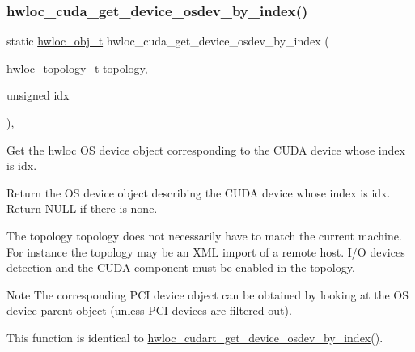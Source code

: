 \subsubsection{\texorpdfstring{hwloc\+\_\+cuda\+\_\+get\+\_\+device\+\_\+osdev\+\_\+by\+\_\+index()}{hwloc\_cuda\_get\_device\_osdev\_by\_index()}}
{\footnotesize\ttfamily static \hyperlink{a00185_ga79b8ab56877ef99ac59b833203391c7d}{hwloc\+\_\+obj\+\_\+t} hwloc\+\_\+cuda\+\_\+get\+\_\+device\+\_\+osdev\+\_\+by\+\_\+index (\begin{DoxyParamCaption}\item[{\hyperlink{a00186_ga9d1e76ee15a7dee158b786c30b6a6e38}{hwloc\+\_\+topology\+\_\+t}}]{topology,  }\item[{unsigned}]{idx }\end{DoxyParamCaption})\hspace{0.3cm}{\ttfamily [inline]}, {\ttfamily [static]}}



Get the hwloc OS device object corresponding to the C\+U\+DA device whose index is {\ttfamily idx}. 

Return the OS device object describing the C\+U\+DA device whose index is {\ttfamily idx}. Return N\+U\+LL if there is none.

The topology {\ttfamily topology} does not necessarily have to match the current machine. For instance the topology may be an X\+ML import of a remote host. I/O devices detection and the C\+U\+DA component must be enabled in the topology.

\begin{DoxyNote}{Note}
The corresponding P\+CI device object can be obtained by looking at the OS device parent object (unless P\+CI devices are filtered out).

This function is identical to \hyperlink{a00220_gac0f3eeaf7712919f298097b1a21307b0}{hwloc\+\_\+cudart\+\_\+get\+\_\+device\+\_\+osdev\+\_\+by\+\_\+index()}. 
\end{DoxyNote}
\mbox{\label{a00219_ga1084285e8ff8b7df91c28917637481c6}} 
